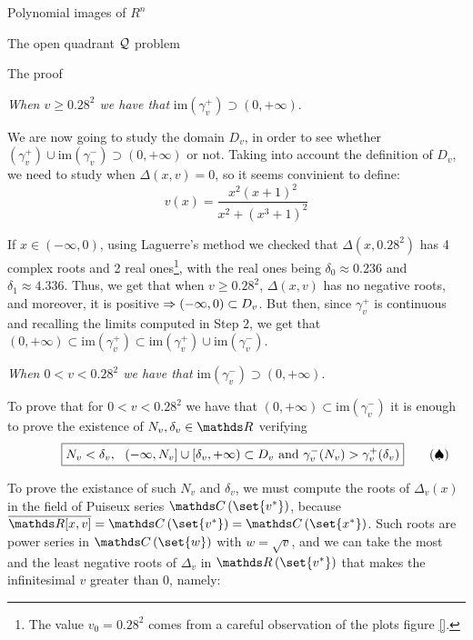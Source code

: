\documentclass[11pt, a4paper, english, twoside, notitlepage]{report}
\begin{document}
\begin{chapter}{Polynomial images of $R^n$}
\begin{section}{The open quadrant $\mathcal{Q}$ problem}
\begin{subsection}{The proof}
\begin{Proof}
			\begin{center}
				 \emph{When $v \geq 0.28^2$ we have that} $\text{im}(\gamma_v^+) \supset (0, +\infty)$.
			\end{center}
			
			We are now going to study the domain $D_v$, in order to see whether $ (\gamma_v^+) \cup \text{im}(\gamma_v^-) \supset (0, +\infty)$ or not. Taking into account the definition of $D_v$, we need to study when $\Delta(x, v) = 0$, so it seems convinient to define:
			$$v(x)=\frac{x^2(x+1)^2}{x^2+(x^3+1)^2}$$
			
			If $x \in (-\infty, 0)$, using Laguerre's method we checked that $\Delta(x, 0.28^2)$ has 4 complex roots and 2 real ones\footnote{The value $v_0 = 0.28^2$ comes from a careful observation of the plots figure \ref{}.}, with the real ones being $\delta_0 \approx 0.236$ and $\delta_1 \approx 4.336$. Thus, we get that when $v \ge 0.28^2$, $\Delta(x, v)$ has no negative roots, and moreover, it is positive $\Rightarrow (-\infty, 0) \subset D_v$. But then, since $\gamma_v^+$ is continuous and recalling the limits computed in Step 2, we get that $(0, +\infty) \subset \text{im}(\gamma_v^+) \subset \text{im}(\gamma_v^+) \cup \text{im}(\gamma_v^-)$.
			
			\begin{center}
				 \emph{When $0 < v < 0.28^2$ we have that} $\text{im}(\gamma_v^-) \supset (0, +\infty)$.
			\end{center} 
			
			To prove that for $0 < v < 0.28^2$ we have that $(0, +\infty) \subset \text{im}(\gamma_v^-)$ it is enough to prove the existence of $N_v, \delta_v\in \R$ verifying			
			\begin{equation*}\qquad \quad
				\boxed{
					 N_v < \delta_v,\ \ (-\infty, N_v] \cup [\delta_v, +\infty) \subset D_v \text{ and } \gamma_v^-(N_v) > \gamma_v^+(\delta_v)\\
				}\qquad (\spadesuit)
			\end{equation*}
			
			To prove the existance of such $N_v$ and $\delta_v$, we must compute the roots of $\Delta_v(x)$ in the field of Puiseux series %
			$\C\left(\set{v^*}\right)$, because $\overline{\R[x, v]} = \C\left(\set{v^*}\right) = \C\left(\set{x^*}\right)$. %
			Such roots are power series in $\C\left(\set{w}\right)$ with $w = \sqrt{v}$, and we can take the most and the least negative roots of $\Delta_v$ in $\R\left(\set{v^*}\right)$ that makes the infinitesimal $v$ greater than 0, namely:
			

\end{Proof}
\end{subsection}
\end{section}
\end{chapter}
\end{document}
